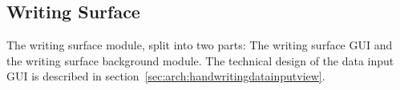 %  
%  
%
%
%
% 
%

\subsection{Writing Surface} %
\label{sec:hwre:writingsurface}

The writing surface module, split into two parts: The writing 
surface GUI and the writing surface background module. The technical design of 
the data input GUI is described in 
section~\ref{sec:arch:handwritingdatainputview}.

